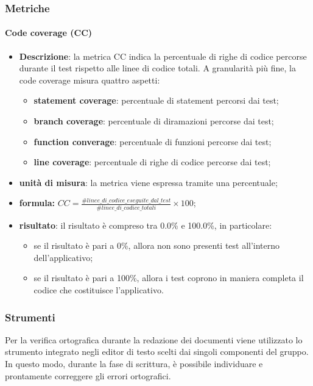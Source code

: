 	\subsubsection{Metriche}
			\paragraph{Code coverage (CC)}
				\begin{itemize}
					\item{\textbf{Descrizione}}: la metrica CC indica la percentuale di righe di codice percorse durante il test rispetto alle linee di codice totali. A granularità più fine, la code coverage misura quattro aspetti: 
						\begin{itemize}
							\item{\textbf{statement coverage}}: percentuale di statement percorsi dai test; 
							\item{\textbf{branch coverage}}: percentuale di diramazioni percorse dai test; 
							\item{\textbf{function converage}}: percentuale di funzioni percorse dai test; 
							\item{\textbf{line coverage}}: percentuale di righe di codice percorse dai test; 
						\end{itemize} 
					\item{\textbf{unità di misura}}: la metrica viene espressa tramite una percentuale;
					\item{\textbf{formula: }} $ CC = \displaystyle\frac{\#linee\_di\_codice\_eseguite\_dal\_test}{\#linee\_di\_codice\_totali}\times100$;
					\item{\textbf{risultato}}: il risultato è compreso tra 0.0\% e 100.0\%, in particolare: 
						\begin{itemize}
							\item se il risultato è pari a 0\%, allora non sono presenti test all'interno dell'applicativo; 
							\item se il risultato è pari a 100\%, allora i test coprono in maniera completa il codice che costituisce l'applicativo. 
						\end{itemize} 
				\end{itemize}

    \subsubsection{Strumenti}
	    Per la verifica ortografica durante la redazione dei documenti viene utilizzato lo strumento integrato negli editor di testo scelti dai singoli componenti del gruppo. In questo modo, durante la fase di scrittura, è possibile individuare e prontamente correggere gli errori ortografici. 
	    
